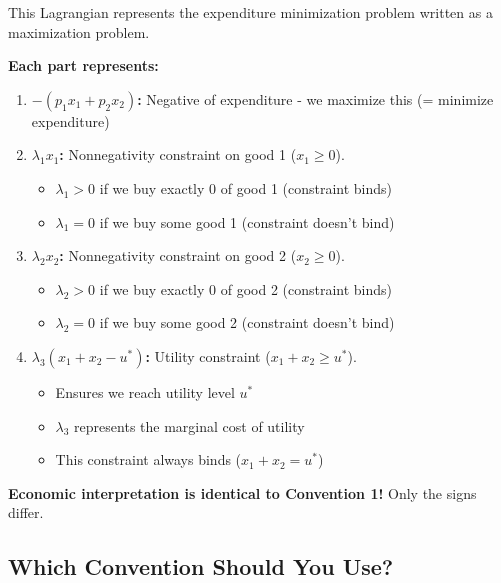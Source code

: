 \documentclass[11pt]{article}
\begin{document}
\begin{tcolorbox}[colback=green!5!white,colframe=green!75!black,title=Answer to Problem 2a (Convention 2)]
This Lagrangian represents the expenditure minimization problem written as a maximization problem.

\textbf{Each part represents:}

\begin{enumerate}
\item \textbf{$-(p_1 x_1 + p_2 x_2)$:} Negative of expenditure - we maximize this (= minimize expenditure)

\item \textbf{$\lambda_1 x_1$:} Nonnegativity constraint on good 1 ($x_1 \geq 0$).
\begin{itemize}
\item $\lambda_1 > 0$ if we buy exactly 0 of good 1 (constraint binds)
\item $\lambda_1 = 0$ if we buy some good 1 (constraint doesn't bind)
\end{itemize}

\item \textbf{$\lambda_2 x_2$:} Nonnegativity constraint on good 2 ($x_2 \geq 0$).
\begin{itemize}
\item $\lambda_2 > 0$ if we buy exactly 0 of good 2 (constraint binds)
\item $\lambda_2 = 0$ if we buy some good 2 (constraint doesn't bind)
\end{itemize}

\item \textbf{$\lambda_3(x_1 + x_2 - u^*)$:} Utility constraint ($x_1 + x_2 \geq u^*$).
\begin{itemize}
\item Ensures we reach utility level $u^*$
\item $\lambda_3$ represents the marginal cost of utility
\item This constraint always binds ($x_1 + x_2 = u^*$)
\end{itemize}
\end{enumerate}

\textbf{Economic interpretation is identical to Convention 1!} Only the signs differ.
\end{tcolorbox}

\subsection{Which Convention Should You Use?}
\end{document}
